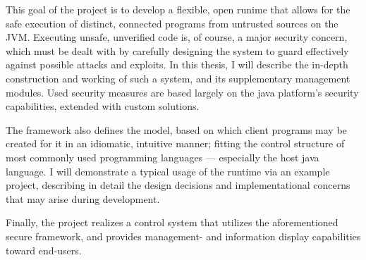 This goal of the project is to develop a flexible, open runime that allows for the safe execution of distinct, connected programs from untrusted sources on the JVM. Executing unsafe, unverified code is, of course, a major security concern, which must be dealt with by carefully designing the system to guard effectively against possible attacks and exploits. In this thesis, I will describe the in-depth construction and working of such a system, and its supplementary management modules. Used security measures are based largely on the java platform's security capabilities, extended with custom solutions.

The framework also defines the model, based on which client programs may be created for it in an idiomatic, intuitive manner; fitting the control structure of most commonly used programming languages --- especially the host java language. I will demonstrate a typical usage of the runtime via an example project, describing in detail the design decisions and implementational concerns that may arise during development.

Finally, the project realizes a control system that utilizes the aforementioned secure framework, and provides management- and information display capabilities toward end-users.


\vfill

%